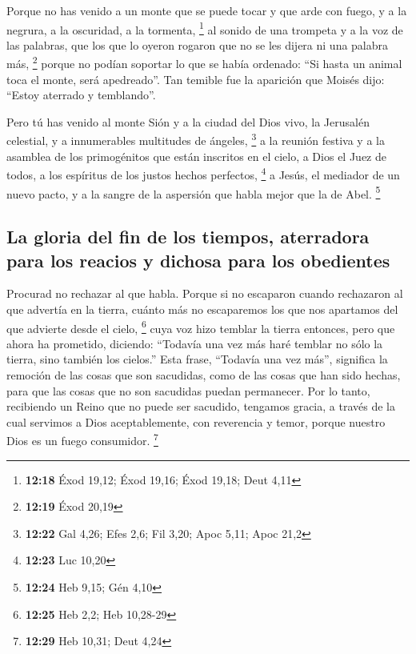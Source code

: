  Porque no has venido a un monte que se puede tocar y que
arde con fuego, y a la negrura, a la oscuridad, a la tormenta,
\footnote{\textbf{12:18} Éxod 19,12; Éxod 19,16; Éxod 19,18; Deut 4,11}
 al sonido de una trompeta y a la voz de las palabras,
que los que lo oyeron rogaron que no se les dijera ni una palabra más,
\footnote{\textbf{12:19} Éxod 20,19}  porque no podían
soportar lo que se había ordenado: ``Si hasta un animal toca el monte,
será apedreado''.  Tan temible fue la aparición que
Moisés dijo: ``Estoy aterrado y temblando''.

 Pero tú has venido al monte Sión y a la ciudad del Dios
vivo, la Jerusalén celestial, y a innumerables multitudes de ángeles,
\footnote{\textbf{12:22} Gal 4,26; Efes 2,6; Fil 3,20; Apoc 5,11; Apoc
  21,2}  a la reunión festiva y a la asamblea de los
primogénitos que están inscritos en el cielo, a Dios el Juez de todos, a
los espíritus de los justos hechos perfectos, \footnote{\textbf{12:23}
  Luc 10,20}  a Jesús, el mediador de un nuevo pacto, y a
la sangre de la aspersión que habla mejor que la de Abel. \footnote{\textbf{12:24}
  Heb 9,15; Gén 4,10}

\hypertarget{la-gloria-del-fin-de-los-tiempos-aterradora-para-los-reacios-y-dichosa-para-los-obedientes}{%
\subsection{La gloria del fin de los tiempos, aterradora para los
reacios y dichosa para los
obedientes}\label{la-gloria-del-fin-de-los-tiempos-aterradora-para-los-reacios-y-dichosa-para-los-obedientes}}

 Procurad no rechazar al que habla. Porque si no
escaparon cuando rechazaron al que advertía en la tierra, cuánto más no
escaparemos los que nos apartamos del que advierte desde el cielo,
\footnote{\textbf{12:25} Heb 2,2; Heb 10,28-29}  cuya voz
hizo temblar la tierra entonces, pero que ahora ha prometido, diciendo:
``Todavía una vez más haré temblar no sólo la tierra, sino también los
cielos.''  Esta frase, ``Todavía una vez más'', significa
la remoción de las cosas que son sacudidas, como de las cosas que han
sido hechas, para que las cosas que no son sacudidas puedan permanecer.
 Por lo tanto, recibiendo un Reino que no puede ser
sacudido, tengamos gracia, a través de la cual servimos a Dios
aceptablemente, con reverencia y temor,  porque nuestro
Dios es un fuego consumidor. \footnote{\textbf{12:29} Heb 10,31; Deut
  4,24}

